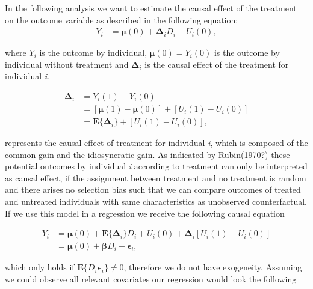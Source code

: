 In the following analysis we want to estimate the causal effect of the treatment on the outcome variable as described in the following equation: 
\begin{align}
	\label{eq:eq1}
	\textit{Y}_i &= \boldsymbol{\mu}(0) + \boldsymbol{\Delta}_i \textit{D}_i + \textit{U}_i(0),
\end{align}

where $\textit{Y}_i$ is the outcome by individual, $\boldsymbol{\mu}(0) = \textit{Y}_i(0)$ is the outcome by individual without treatment and $\boldsymbol{\Delta}_i$ is the causal effect of the treatment  for individual \textit{i}.

\begin{equation}
  \begin{aligned}
	\label{eq:eq1}
	\boldsymbol{\Delta}_i &= \textit{Y}_i(1) - \textit{Y}_i(0) \\
						 &= [\boldsymbol{\mu}(1)- \boldsymbol{\mu}(0)] + [\textit{U}_i(1)-\textit{U}_i(0)] \\
						 &= \boldsymbol{E} \{ \boldsymbol{\Delta}_i \} + [\textit{U}_i(1)-\textit{U}_i(0)],
  \end{aligned}
\end{equation}
  

represents the causal effect of treatment for individual \textit{i}, which is composed of the common gain and the idiosyncratic gain. As indicated by Rubin(1970?) these potential outcomes by individual \textit{i} according to treatment can only be interpreted as causal effect, if the assignment between treatment and no treatment is random and there arises no selection bias such that we can compare outcomes of treated and untreated individuals with same characteristics as unobserved counterfactual. If we use this model in a regression we receive the following causal equation

\begin{equation}
  \begin{aligned}
	\label{eq:eq1}
	\textit{Y}_i &= \boldsymbol{\mu}(0) + \boldsymbol{E} \{ \boldsymbol{\Delta}_i \} \textit{D}_i + \textit{U}_i(0) + \boldsymbol{\Delta}_i[\textit{U}_i(1)-\textit{U}_i(0)] \\
				 &= \boldsymbol{\mu}(0) + \boldsymbol{\beta} \textit{D}_i + \boldsymbol{\epsilon}_i,
  \end{aligned}
\end{equation}
  
which only holds if $\boldsymbol{E}\{\textit{D}_i\boldsymbol{\epsilon}_i\} \neq 0$, therefore we do not have exogeneity. Assuming we could observe all relevant covariates our regression would look the following

